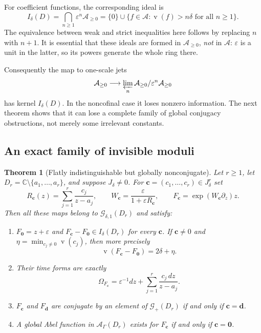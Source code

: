 \documentclass[11pt,a4paper]{article}
\numberwithin{equation}{section}
\newtheorem{theorem}{Theorem}[section]
\theoremstyle{definition}
\theoremstyle{remark}
\newcommand{\C}{\mathbb C}
\newcommand{\A}{\mathcal A}
\newcommand{\G}{\mathcal G}
\newcommand{\eps}{\varepsilon}
\newcommand{\val}{\operatorname{v}}
\begin{document}
For coefficient functions, the corresponding ideal is
\begin{equation}\label{eq:flat-functions}
 I_\delta(D)=\bigcap_{n\geq1}\eps^n\A_{\geq0}
   =\{0\}\cup\{f\in\A:\val(f)>n\delta\text{ for all }n\geq1\}.
\end{equation}
The equivalence between weak and strict inequalities here follows by
replacing $n$ with $n+1$.  It is essential that these ideals are formed in
$\A_{\geq0}$, \emph{not} in $\A$: $\eps$ is a unit in the latter,
so its powers generate the whole ring there.

Consequently the map to one-scale jets
\begin{equation}\label{eq:jet-map}
 \A_{\geq0}\longrightarrow
       \varprojlim_n\A_{\geq0}/\eps^n\A_{\geq0}
\end{equation}
has kernel $I_\delta(D)$.  In the noncofinal case it loses nonzero
information.  The next theorem shows that it can lose a complete family
of global conjugacy obstructions, not merely some irrelevant constants.

\subsection{An exact family of invisible moduli}

\begin{theorem}[Flatly indistinguishable but globally nonconjugate]
\label{thm:flat}
Let $r\geq1$, let $D_r=\C\setminus\{a_1,\ldots,a_r\}$, and suppose
$J_\delta\ne0$.  For $\mathbf c=(c_1,\ldots,c_r)\in J_\delta^r$ set
\begin{equation}\label{eq:flat-family}
 R_{\mathbf c}(z)=\sum_{j=1}^r\frac{c_j}{z-a_j},\qquad
 W_{\mathbf c}=\frac{\eps}{1+\eps R_{\mathbf c}},\qquad
 F_{\mathbf c}=\exp(W_{\mathbf c}\partial_z)z.
\end{equation}
Then all these maps belong to $\G_{\delta,1}(D_r)$ and satisfy:
\begin{enumerate}[label=(\alph*)]
\item $F_{\mathbf0}=z+\eps$ and
$F_{\mathbf c}-F_{\mathbf0}\in I_\delta(D_r)$ for every $\mathbf c$.
If $\mathbf c\ne0$ and $\eta=\min_{c_j\ne0}\val(c_j)$, then more precisely
\begin{equation}\label{eq:flat-valuation}
 \val(F_{\mathbf c}-F_{\mathbf0})=2\delta+\eta.
\end{equation}
\item Their time forms are exactly
\begin{equation}\label{eq:exact-flat-form}
 \Omega_{F_{\mathbf c}}=\eps^{-1}dz+
                    \sum_{j=1}^r\frac{c_j\,dz}{z-a_j}.
\end{equation}
\item $F_{\mathbf c}$ and $F_{\mathbf d}$ are conjugate by an element
of $\G_+(D_r)$ if and only if $\mathbf c=\mathbf d$.
\item A global Abel function in $\A_\Gamma(D_r)$ exists for
$F_{\mathbf c}$ if and only if $\mathbf c=\mathbf0$.
\end{enumerate}
\end{theorem}
\end{document}
